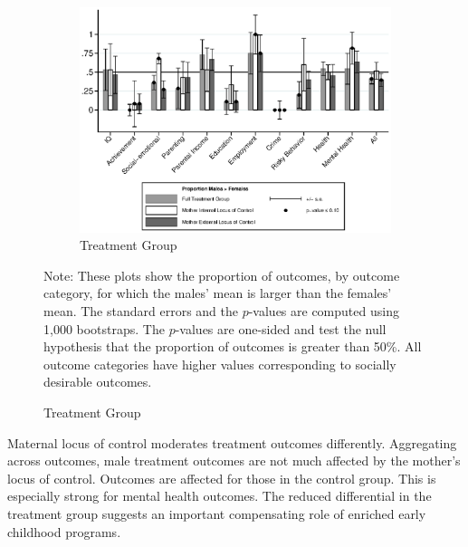 \begin{figure}[!htbp]
\begin{subfigure}[h]{0.7\textwidth}
	\centering
	\caption{Treatment Group}
	\includegraphics[width=\textwidth]{output/gendergaps-treatment-moderated-mlocus}
	\end{subfigure}
\footnotesize \justify
Note: These plots show the proportion of outcomes, by outcome category, for which the males' mean is larger than the females' mean. The standard errors and the $p$-values are computed using 1,000 bootstraps. The $p$-values are one-sided and test the null hypothesis that the proportion of outcomes is greater than 50\%. All outcome categories have higher values corresponding to socially desirable outcomes.
\end{figure}

Maternal locus of control moderates treatment outcomes differently. Aggregating across outcomes, male treatment outcomes are not much affected by the mother's locus of control. Outcomes are affected for those in the control group. This is especially strong for mental health outcomes. The reduced differential in the treatment group suggests an important compensating role of enriched early childhood programs.




